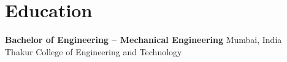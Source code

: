 \documentclass[10pt, a4paper]{article}
\begin{document}
\section{Education}
\textbf{Bachelor of Engineering -- Mechanical Engineering} \hfill Mumbai, India \\
Thakur College of Engineering and Technology
\end{document}
